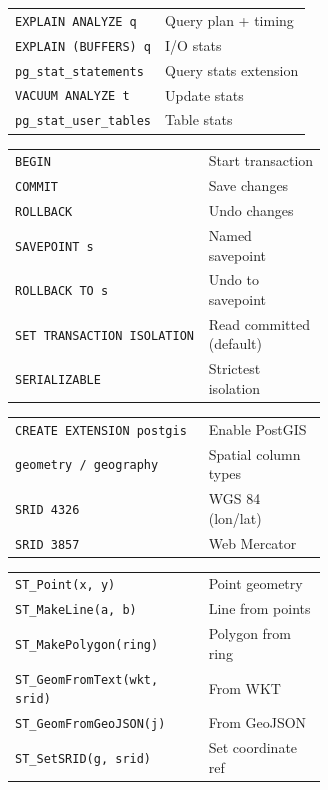 \documentclass[10pt]{extarticle}
\begin{document}
\begin{multicols}{2}
\begin{tabularx}{\linewidth}{@{}l@{\enspace}Y@{}}
\texttt{EXPLAIN ANALYZE q}          & Query plan + timing \\
\texttt{EXPLAIN (BUFFERS) q}        & I/O stats \\
\texttt{pg\_stat\_statements}       & Query stats extension \\
\texttt{VACUUM ANALYZE t}           & Update stats \\
\texttt{pg\_stat\_user\_tables}     & Table stats \\
\end{tabularx}

\begin{tabularx}{\linewidth}{@{}>{\raggedright\arraybackslash}p{0.62\linewidth}@{\enspace}Y@{}}
\texttt{BEGIN}                       & Start transaction \\
\texttt{COMMIT}                      & Save changes \\
\texttt{ROLLBACK}                    & Undo changes \\
\texttt{SAVEPOINT s}                 & Named savepoint \\
\texttt{ROLLBACK TO s}              & Undo to savepoint \\
\texttt{SET TRANSACTION ISOLATION}  & Read committed (default) \\
\texttt{SERIALIZABLE}               & Strictest isolation \\
\end{tabularx}

\begin{tabularx}{\linewidth}{@{}>{\raggedright\arraybackslash}p{0.62\linewidth}@{\enspace}Y@{}}
\texttt{CREATE EXTENSION postgis}   & Enable PostGIS \\
\texttt{geometry / geography}       & Spatial column types \\
\texttt{SRID 4326}                   & WGS 84 (lon/lat) \\
\texttt{SRID 3857}                   & Web Mercator \\
\end{tabularx}

\begin{tabularx}{\linewidth}{@{}>{\raggedright\arraybackslash}p{0.62\linewidth}@{\enspace}Y@{}}
\texttt{ST\_Point(x, y)}            & Point geometry \\
\texttt{ST\_MakeLine(a, b)}         & Line from points \\
\texttt{ST\_MakePolygon(ring)}      & Polygon from ring \\
\texttt{ST\_GeomFromText(wkt, srid)} & From WKT \\
\texttt{ST\_GeomFromGeoJSON(j)}     & From GeoJSON \\
\texttt{ST\_SetSRID(g, srid)}       & Set coordinate ref \\
\end{tabularx}


\end{multicols}
\end{document}
